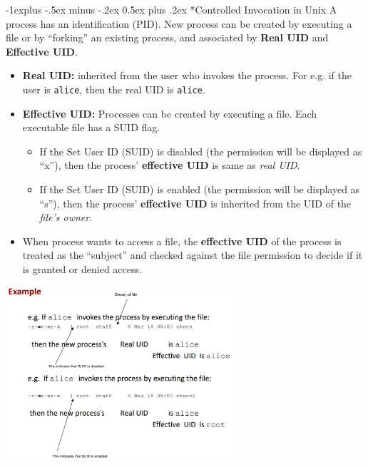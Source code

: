 \documentclass[10pt,landscape]{article}
\makeatletter
\renewcommand{\subsection}{\@startsection{subsection}{2}{0mm}%
                                {-1explus -.5ex minus -.2ex}%
                                {0.5ex plus .2ex}%
                                {\normalfont\normalsize\bfseries}}
\makeatother
\begin{document}
\begin{multicols*}{3}
\subsection*{Controlled Invocation in Unix}
A process has an identification (PID). New process can be created by
executing a file or by “forking” an existing process, and associated by \textbf{Real UID} and \textbf{Effective UID}.
\begin{itemize}[noitemsep,wide=0pt, leftmargin=\dimexpr{} + 2\relax]
    \item \textbf{Real UID:} inherited from the user who invokes the process. For e.g. if
    the user is \verb|alice|, then the real UID is \verb|alice|.
    \item \textbf{Effective UID:} Processes can be created by executing a file. Each executable file has a SUID
    flag. 
    \begin{itemize}[noitemsep,wide=0pt, leftmargin=\dimexpr{} + 2\relax]
        \item If the Set User ID (SUID) is disabled (the permission will be displayed as “x”),
        then the process’ \textbf{effective UID} is same as \textit{real UID}.
        \item If the Set User ID (SUID) is enabled (the permission will be displayed as “s”), then
        the process’ \textbf{effective UID} is inherited from the UID of the \textit{file’s owner}. 
    \end{itemize}
    \item When process wants to access a file, the \textbf{effective UID} of the process is treated as
    the “subject” and checked against the file permission to decide if it is granted or denied access.
\end{itemize}
\includegraphics*[width=8.5cm]{images/suidexample.png}


\end{multicols*}
\end{document}
